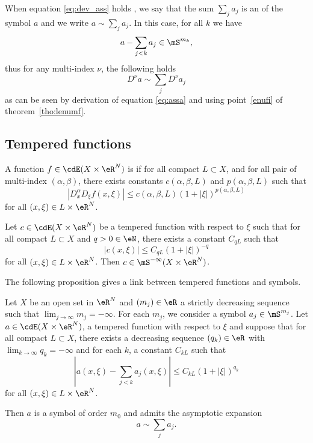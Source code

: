 When equation \eqref{eq:dev_ass} holds , we say that the sum $\sum_ja_j$ is an  of the symbol $a$ and we write $a\sim\sum_ja_j$. In this case, for all $k$ we have
\begin{equation} \label{eq:assa}
	a-\sum_{j<k}a_j\in\mS^{m_k},
\end{equation}
thus for any multi-index $\nu$, the following holds
\[
	D^{\nu}a\sim\sum_jD^{\nu}a_j
\]
as can be seen by derivation of equation \eqref{eq:assa} and using point~\ref{enufi} of theorem~\ref{tho:lenumf}.

\subsection{Tempered functions}

A function $f\in\cdE(X\times\eR^N)$ is  if for all compact $L\subset X$, and for all pair of multi-index $(\alpha,\beta)$, there exists constants $c(\alpha,\beta,L)$ and $p(\alpha,\beta,L)$ such that
\[
	|D_x^{\alpha}D_{\xi}f(x,\xi)|\leq c(\alpha,\beta,L)(1+|\xi|)^{p(\alpha,\beta,L)}
\]
for all $(x,\xi)\in L\times\eR^N$.


\begin{lemma}
	Let $c\in\cdE(X\times\eR^N)$ be a tempered function with respect to $\xi$ such that for all compact $L\subset X$ and $q>0\in\eN$, there exists a constant $C_{qL}$ such that
	\[
		|c(x,\xi)|\leq C_{qL}(1+|\xi|)^{-q}
	\]
	for all $(x,\xi)\in L\times\eR^N$. Then $c\in\mS^{-\infty}(X\times\eR^N)$.
	\label{lem:csymbol}
\end{lemma}

The following proposition gives a link between tempered functions and symbols.

\begin{proposition}
	Let $X$ be an open set in $\eR^N$ and $(m_j)\in\eR$ a strictly decreasing sequence such that $\lim_{j\to\infty}m_j=-\infty$. For each $m_j$, we consider a symbol $a_j\in\mS^{m_j}$. Let $a\in\cdE(X\times\eR^N)$, a tempered function with respect to $\xi$ and suppose that for all compact $L\subset X$, there exists a decreasing sequence $(q_k)\in\eR$ with $\lim_{k\to\infty}q_k=-\infty$ and for each $k$, a constant $C_{kL}$ such that
	\begin{equation}
		|a(x,\xi)-\sum_{j<k}a_j(x,\xi)|\leq C_{kL}(1+|\xi|)^{q_k}
	\end{equation}
	for all $(x,\xi)\in L\times\eR^N$.

	Then $a$ is a symbol of order $m_0$ and admits the asymptotic expansion
	\[
		a\sim\sum_ja_j.
	\]

\end{proposition}

